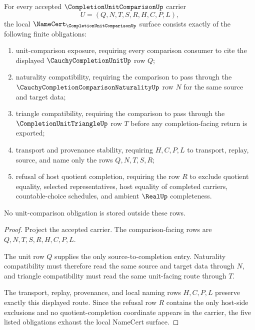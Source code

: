 \begin{theorem}
\label{thm:completion-unit-comparison-namecert-obligations}
For every accepted $\CompletionUnitComparisonUp$ carrier
$$
U=(Q,N,T,S,R,H,C,P,L),
$$
the local $\NameCert_{\CompletionUnitComparisonUp}$ surface consists exactly of the following finite obligations:
\begin{enumerate}
\item unit-comparison exposure, requiring every comparison consumer to cite the displayed $\CauchyCompletionUnitUp$ row $Q$;
\item naturality compatibility, requiring the comparison to pass through the $\CauchyCompletionComparisonNaturalityUp$ row $N$ for the same source and target data;
\item triangle compatibility, requiring the comparison to pass through the $\CompletionUnitTriangleUp$ row $T$ before any completion-facing return is exported;
\item transport and provenance stability, requiring $H,C,P,L$ to transport, replay, source, and name only the rows $Q,N,T,S,R$;
\item refusal of host quotient completion, requiring the row $R$ to exclude quotient equality, selected representatives, host equality of completed carriers, countable-choice schedules, and ambient $\RealUp$ completeness.
\end{enumerate}
No unit-comparison obligation is stored outside these rows.
\end{theorem}
\begin{proof}
Project the accepted carrier. The comparison-facing rows are $Q,N,T,S,R,H,C,P,L$.

The unit row $Q$ supplies the only source-to-completion entry. Naturality compatibility must therefore read the same source and target data through $N$, and triangle compatibility must read the same unit-facing route through $T$.

The transport, replay, provenance, and local naming rows $H,C,P,L$ preserve exactly this displayed route. Since the refusal row $R$ contains the only host-side exclusions and no quotient-completion coordinate appears in the carrier, the five listed obligations exhaust the local NameCert surface.
\end{proof}


